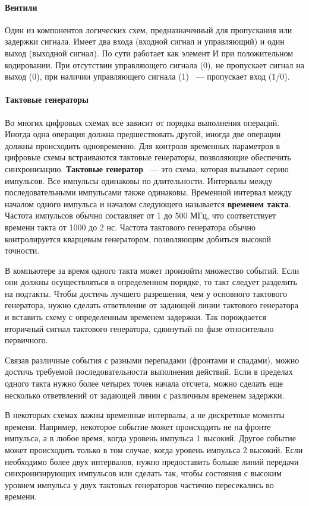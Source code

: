 \documentclass[10pt]{article}
\begin{document}
	\paragraph{Вентили}
	Один из компонентов логических схем, предназначенный для пропускания или задержки сигнала. Имеет два входа (входной сигнал и управляющий) и один выход (выходной сигнал). По сути работает как элемент И при положительном кодировании. При отсутствии управляющего сигнала (0), не пропускает сигнал на выход (0), при наличии управляющего сигнала (1) ~--- пропускает вход (1/0).
	\paragraph{Тактовые генераторы}
	Во многих цифровых схемах все зависит от порядка выполнения операций. Иногда одна операция должна предшествовать другой, иногда две операции должны происходить одновременно. Для контроля временных параметров в цифровые схемы встраиваются тактовые генераторы, позволяющие обеспечить синхронизацию. \textbf{Тактовые генератор} ~--- это схема, которая вызывает серию импульсов. Все импульсы одинаковы по длительности. Интервалы между последовательными импульсами также одинаковы. Временной интервал между началом одного импульса и началом следующего называется \textbf{временем такта}. Частота импульсов обычно составляет от 1 до 500 МГц, что соответствует времени такта от 1000 до 2 нс. Частота тактового генератора обычно контролируется кварцевым генератором, позволяющим добиться высокой точности.

	В компьютере за время одного такта может произойти множество событий. Если они должны осуществляться в определенном порядке, то такт следует разделить на подтакты. Чтобы достичь лучшего разрешения, чем у основного тактового генератора, нужно сделать ответвление от задающей линии тактового генератора и вставить схему с определенным временем задержки. Так порождается вторичный сигнал тактового генератора, сдвинутый по фазе относительно первичного.

	Связав различные события с разными перепадами (фронтами и спадами), можно достичь требуемой последовательности выполнения действий. Если в пределах одного такта нужно более четырех точек начала отсчета, можно сделать еще несколько ответвлений от задающей линии с различным временем задержки.

	В некоторых схемах важны временные интервалы, а не дискретные моменты времени. Например, некоторое событие может происходить не на фронте импульса, а в любое время, когда уровень импульса 1 высокий. Другое событие может происходить только в том случае, когда уровень импульса 2 высокий. Если необходимо более двух интервалов, нужно предоставить больше линий передачи синхронизирующих импульсов или сделать так, чтобы состояния с высоким уровнем импульса у двух тактовых генераторов частично пересекались во времени.
\end{document}
